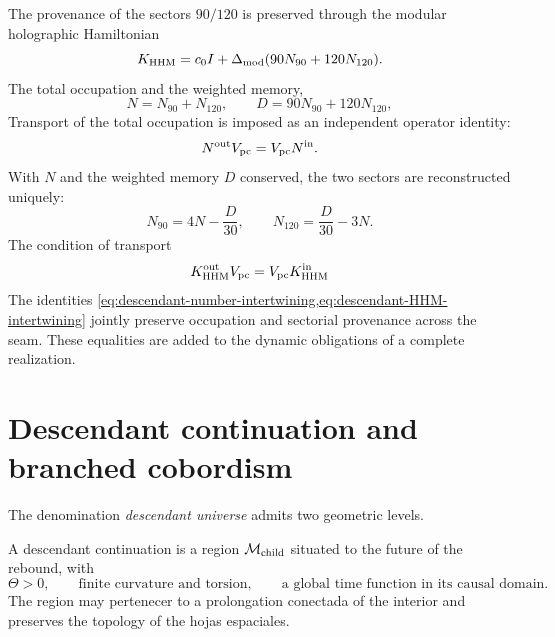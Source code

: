The provenance of the sectors \(90/120\) is preserved through the modular
holographic Hamiltonian
\begin{equation}
 K_{\rm HHM}=c_0I+\Delta_{\rm mod}
 (90N_{90}+120N_{120}).
 \label{eq:descendant-HHM}
\end{equation}
The total occupation and the weighted memory,
\begin{equation}
 N=N_{90}+N_{120},
 \qquad
 D=90N_{90}+120N_{120},
 \label{eq:descendant-HHM-data}
\end{equation}
Transport of the total occupation is imposed as an independent operator identity:
\begin{equation}
 N^{\rm out}V_{\rm pc}=V_{\rm pc}N^{\rm in}.
 \label{eq:descendant-number-intertwining}
\end{equation}
With \(N\) and the weighted memory \(D\) conserved, the two sectors are
reconstructed uniquely:
\begin{equation}
 N_{90}=4N-\frac D{30},
 \qquad
 N_{120}=\frac D{30}-3N.
 \label{eq:descendant-HHM-recovery}
\end{equation}
The condition of transport
\begin{equation}
 K_{\rm HHM}^{\rm out}V_{\rm pc}
 =V_{\rm pc}K_{\rm HHM}^{\rm in}
 \label{eq:descendant-HHM-intertwining}
\end{equation}
The identities
\cref{eq:descendant-number-intertwining,eq:descendant-HHM-intertwining}
jointly preserve occupation and sectorial provenance across the
seam. These equalities are added to the dynamic obligations of a
complete realization.

\section{Descendant continuation and branched cobordism}

The denomination \emph{descendant universe} admits two
geometric levels.

\begin{definition}
\label{def:descendant-minimal}
A descendant continuation is a region
\(\mathcal M_{\rm child}\) situated to the future of the rebound, with
\begin{equation}
 \Theta>0,
 \qquad
 \text{finite curvature and torsion},
 \qquad
 \text{a global time function in its causal domain}.
 \label{eq:descendant-minimal-conditions}
\end{equation}
The region may pertenecer to a prolongation conectada of the interior and
preserves the topology of the hojas espaciales.
\end{definition}

